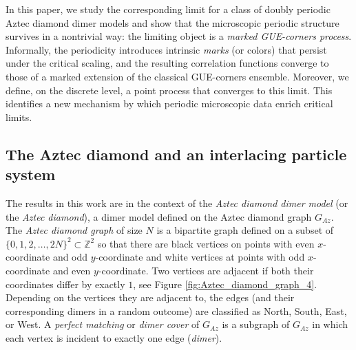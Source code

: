 \documentclass[11pt]{article}
\theoremstyle{plain}
\theoremstyle{definition}
\numberwithin{equation}{section}
\begin{document}
In this paper, we study the corresponding 
limit for a class of doubly periodic Aztec diamond dimer models and show that the microscopic periodic structure survives in a nontrivial way: the limiting object is a \textit{marked GUE-corners process}. Informally, the periodicity introduces intrinsic \textit{marks} (or colors) that persist under the critical scaling, and the resulting correlation functions converge to those of a marked extension of the classical GUE-corners ensemble. 
Moreover, we define, on the discrete level, a point process that converges to this limit. 
This identifies a new mechanism by which periodic microscopic data enrich critical limits.



\subsection{The Aztec diamond and an interlacing particle system}\label{sec:Aztec_interlacing_intro}

The results in this work are in the context of the \textit{Aztec diamond dimer model} (or the \textit{Aztec diamond}), a dimer model defined on the {Aztec diamond graph} $G_{Az}$. The \textit{Aztec diamond graph} of size $N$ is a bipartite graph defined on a subset of $\{0,1,2,\ldots, 2N\}^2\subset \mathbb{Z}^2$ so that there are black vertices on points with even $x$-coordinate and odd $y$-coordinate and white vertices at points with odd $x$-coordinate and even $y$-coordinate. Two vertices are adjacent if both their coordinates differ by exactly $1$, see Figure \ref{fig:Aztec_diamond_graph_4}. Depending on the vertices they are adjacent to, the edges  (and their corresponding dimers in a random outcome) are classified as North, South, East, or West. A \emph{perfect matching} or \emph{dimer cover} of $G_{Az}$ is a subgraph of $G_{Az}$ in which each vertex is incident to exactly one edge (\emph{dimer}).  
\end{document}
